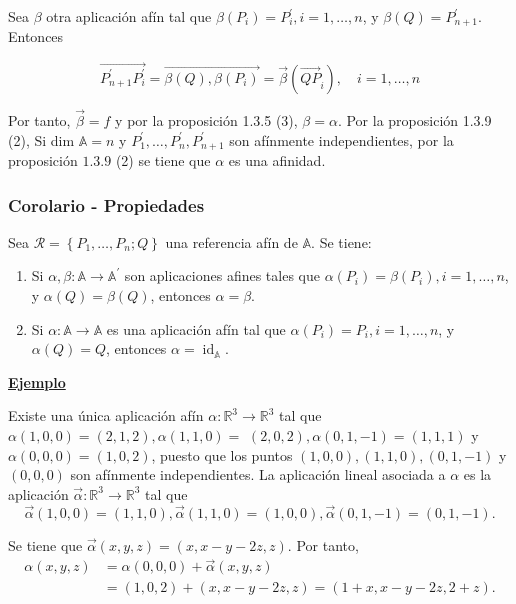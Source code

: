 \documentclass[12pt, a4paper, ones, notitlepage, openany,titlepage]{article}
\newcommand{\ejemplo}{\noindent\underline{\textbf{Ejemplo}}}
\begin{document}
\noindent Sea $\beta$ otra aplicación afín tal que $\beta\left(P_{i}\right)=P_{i}^{\prime}, i=1, \ldots, n$, y $\beta(Q)=P_{n+1}^{\prime}$. Entonces

$$
\overrightarrow{P_{n+1}^{\prime} P_{i}^{\prime}}=\overrightarrow{\beta(Q), \beta\left(P_{i}\right)}=\vec{\beta}\left(\overrightarrow{Q P}_{i}\right), \quad i=1, \ldots, n
$$

Por tanto, $\vec{\beta}=f$ y por la proposición 1.3.5 (3), $\beta=\alpha$. Por la proposición 1.3.9 (2), Si dim $\mathbb{A}=n$ y $P_{1}^{\prime}, \ldots, P_{n}^{\prime}, P_{n+1}^{\prime}$ son afínmente independientes, por la proposición $1.3 .9$ (2) se tiene que $\alpha$ es una afinidad.

\subsubsection{Corolario - Propiedades}
\noindent Sea $\mathcal{R}=\left\{P_{1}, \ldots, P_{n} ; Q\right\}$ una referencia afín de $\mathbb{A}$. Se tiene:

\begin{enumerate}[label=(\arabic*)]

\item Si $\alpha, \beta: \mathbb{A} \rightarrow \mathbb{A}^{\prime}$ son aplicaciones afines tales que $\alpha\left(P_{i}\right)=\beta\left(P_{i}\right), i=1, \ldots, n$, y $\alpha(Q)=\beta(Q)$, entonces $\alpha=\beta$.

\item Si $\alpha: \mathbb{A} \rightarrow \mathbb{A}$ es una aplicación afín tal que $\alpha\left(P_{i}\right)=P_{i}, i=1, \ldots, n$, y $\alpha(Q)=Q$, entonces $\alpha=\operatorname{id}_{\mathbb{A}}$.

\end{enumerate}

\ejemplo

Existe una única aplicación afín $\alpha: \mathbb{R}^{3} \rightarrow \mathbb{R}^{3}$ tal que $\alpha(1,0,0)=(2,1,2), \alpha(1,1,0)=$ $(2,0,2), \alpha(0,1,-1)=(1,1,1)$ y $\alpha(0,0,0)=(1,0,2)$, puesto que los puntos $(1,0,0),(1,1,0),(0,1,-1)$ y $(0,0,0)$ son afínmente independientes. La aplicación lineal asociada a $\alpha$ es la aplicación $\vec{\alpha}: \mathbb{R}^{3} \rightarrow \mathbb{R}^{3}$ tal que
$$
\vec{\alpha}(1,0,0)=(1,1,0), \vec{\alpha}(1,1,0)=(1,0,0), \vec{\alpha}(0,1,-1)=(0,1,-1) .
$$

\noindent Se tiene que $\vec{\alpha}(x, y, z)=(x, x-y-2 z, z)$. Por tanto,
$$
\begin{aligned}
\alpha(x, y, z) & =\alpha(0,0,0)+\vec{\alpha}(x, y, z) \\
& =(1,0,2)+(x, x-y-2 z, z)=(1+x, x-y-2 z, 2+z) .
\end{aligned}
$$
\end{document}
